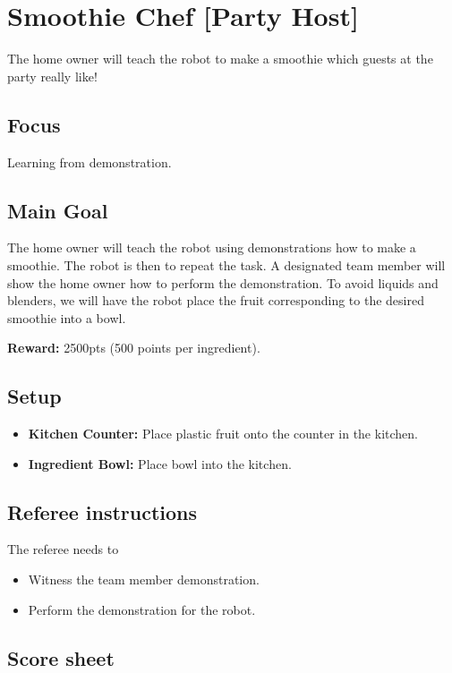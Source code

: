 \section{Smoothie Chef [Party Host]}
The home owner will teach the robot to make a smoothie which guests at the party really like!

\subsection{Focus}
Learning from demonstration.

\subsection{Main Goal}
The home owner will teach the robot using demonstrations how to make a smoothie. The robot is then to repeat the task. A designated team member will show the home owner how to perform the demonstration. To avoid liquids and blenders, we will have the robot place the fruit corresponding to the desired smoothie into a bowl.

\noindent\textbf{Reward:} 2500pts (500 points per ingredient).


\subsection{Setup}
\begin{itemize}[nosep]
	\item \textbf{Kitchen Counter:} Place plastic fruit onto the counter in the kitchen.
	\item \textbf{Ingredient Bowl:} Place bowl into the kitchen.
\end{itemize}

\subsection{Referee instructions}
The referee needs to
\begin{itemize}
	\item Witness the team member demonstration.
	\item Perform the demonstration for the robot.
\end{itemize}


\newpage
\subsection{Score sheet}

